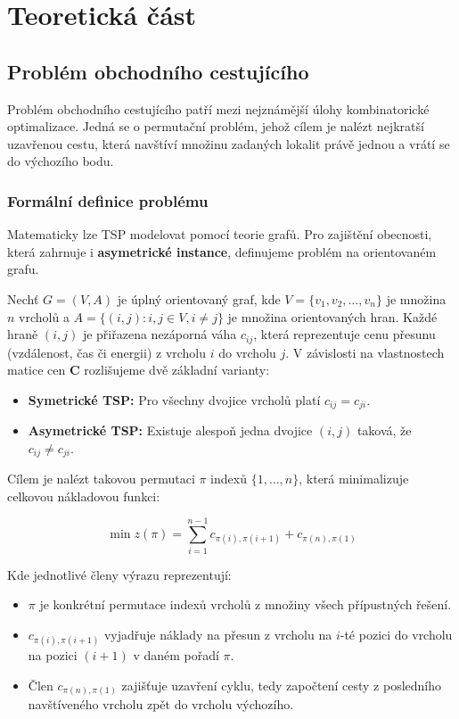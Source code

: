 \chapter{Teoretická část}

\section{Problém obchodního cestujícího}
Problém obchodního cestujícího patří mezi nejznámější úlohy kombinatorické optimalizace. Jedná se o permutační problém, jehož cílem je nalézt nejkratší uzavřenou cestu, která navštíví množinu zadaných lokalit právě jednou a vrátí se do výchozího bodu.

\subsection{Formální definice problému}

Matematicky lze TSP modelovat pomocí teorie grafů. Pro zajištění obecnosti, která zahrnuje i \textbf{asymetrické instance}, definujeme problém na orientovaném grafu. 

Nechť $G = (V, A)$ je úplný orientovaný graf, kde $V = \{v_1, v_2, \dots, v_n\}$ je množina $n$ vrcholů a $A = \{(i, j) : i, j \in V, i \neq j\}$ je množina orientovaných hran. Každé hraně $(i, j)$ je přiřazena nezáporná váha $c_{ij}$, která reprezentuje cenu přesunu (vzdálenost, čas či energii) z vrcholu $i$ do vrcholu $j$. V závislosti na vlastnostech matice cen $\mathbf{C}$ rozlišujeme dvě základní varianty:
\begin{itemize}
    \item \textbf{Symetrické TSP:} Pro všechny dvojice vrcholů platí $c_{ij} = c_{ji}$.
    \item \textbf{Asymetrické TSP:} Existuje alespoň jedna dvojice $(i, j)$ taková, že $c_{ij} \neq c_{ji}$.
\end{itemize}

Cílem je nalézt takovou permutaci $\pi$ indexů $\{1, \dots, n\}$, která minimalizuje celkovou nákladovou funkci:

\begin{equation}
    \min z(\pi) = \sum_{i=1}^{n-1} c_{\pi(i), \pi(i+1)} + c_{\pi(n), \pi(1)}
\end{equation}

Kde jednotlivé členy výrazu reprezentují:
\begin{itemize}
    \item $\pi$ je konkrétní permutace indexů vrcholů z množiny všech přípustných řešení.
    \item $c_{\pi(i), \pi(i+1)}$ vyjadřuje náklady na přesun z vrcholu na $i$-té pozici do vrcholu na pozici $(i+1)$ v daném pořadí $\pi$.
    \item Člen $c_{\pi(n), \pi(1)}$ zajišťuje uzavření cyklu, tedy započtení cesty z posledního navštíveného vrcholu zpět do vrcholu výchozího.
\end{itemize}

